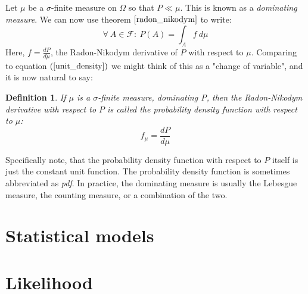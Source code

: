 \documentclass[12pt, a4paper]{article}
\newtheorem{definition}{Definition}[section]
\begin{document}
Let $\mu$ be a $\sigma$-finite measure on $\Omega$ so that $P\ll\mu$. This is known as a \textit{dominating measure}. We can now use theorem $\ref{radon_nikodym}$ to write:
\begin{equation}
\forall\ A\in\mathcal{F}:\ P(A)=\int_A f\ d\mu
\end{equation}
Here, $f=\frac{dP}{d\mu}$, the Radon-Nikodym derivative of $P$ with respect to $\mu$. Comparing to equation $(\ref{unit_density})$ we might think of this as a "change of variable", and it is now natural to say:

\begin{definition}
If $\mu$ is a $\sigma$-finite measure, dominating P, then the Radon-Nikodym derivative with respect to $P$ is called the probability density function with respect to $\mu$:
\begin{equation}
f_\mu=\frac{dP}{d\mu}
\end{equation}
\end{definition}

Specifically note, that the probability density function with respect to $P$ itself is just the constant unit function. The probability density function is sometimes abbreviated as \textit{pdf}. In practice, the dominating measure is usually the Lebesgue measure, the counting measure, or a combination of the two.

\section{Statistical models}

\section{Likelihood}
\end{document}
